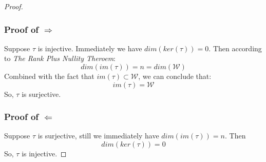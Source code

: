 \documentclass{article}
\begin{document}
\begin{description}
\begin{proof}
		\subsubsection*{Proof of $\Rightarrow$}
			Suppose $\tau$ is injective. Immediately we have $dim(ker(\tau)) = 0$. Then according to \emph{The Rank Plus Nullity Theroem}:
			$$ dim(im(\tau)) = n = dim(\mathcal{W})$$
			Combined with the fact that $im(\tau) \subset \mathcal{W}$, we can conclude that:
			$$ im(\tau) = \mathcal{W}$$
			So, $\tau$ is surjective.
		\subsubsection*{Proof of $\Leftarrow$}
			Suppose $\tau$ is surjective, still we immediately have $dim(im(\tau)) = n$. Then
			$$dim(ker(\tau)) = 0$$
			So, $\tau$ is injective.
	\end{proof}
\end{description}
\end{document}
